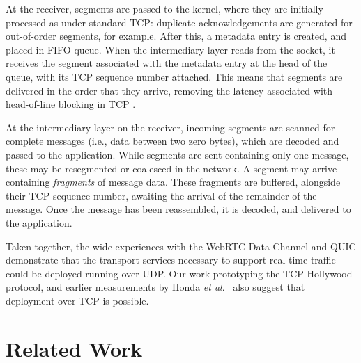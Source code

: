 \documentclass{sig-alternate-05-2015}
\newcommand{\todo}[1]{\textbf{\textcolor{red}{To do -- #1}}}
\begin{document}
At the receiver, segments are passed to the kernel, where they are
initially processed as under standard TCP: duplicate acknowledgements are
generated for out-of-order segments, for example. After this, a metadata
entry is created, and placed in FIFO queue. When the intermediary layer
reads from the socket, it receives the segment associated with the
metadata entry at the head of the queue, with its TCP sequence number
attached. This means that segments are delivered in the order that they
arrive, removing the latency associated with head-of-line blocking in TCP
\cite{mcquistin2016tcp}. 

At the intermediary layer on the receiver, incoming segments are scanned
for complete messages (i.e., data between two zero bytes), which are
decoded and passed to the application. While segments are sent
containing only one message, these may be resegmented or coalesced in the
network. A segment may arrive containing \emph{fragments} of message
data. These fragments are buffered, alongside their TCP sequence number, 
awaiting the arrival of the remainder of the message. Once the message has
been reassembled, it is decoded, and delivered to the application.

Taken together, the wide experiences with the WebRTC Data Channel and QUIC
demonstrate that the transport services necessary to support real-time
traffic could be deployed running over UDP. Our work prototyping the TCP
Hollywood protocol, and earlier measurements by Honda \emph{et al}.\
\cite{honda:2011:extend-tcp} also suggest that deployment over TCP is
possible.

\section{Related Work}
\label{sec:related}

%
%
\end{document}
